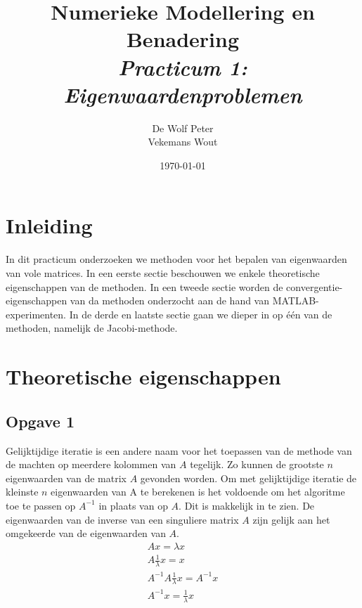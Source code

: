 \documentclass[a4paper, 12pt, titlepage]{report}
\begin{document}
\title{\textbf{Numerieke Modellering en Benadering}\\\textit{Practicum 1: Eigenwaardenproblemen}\\}
\author{De Wolf Peter\\ Vekemans Wout}

\date{\today}
\begin{titlepage}
	\maketitle
	\thispagestyle{empty}
\end{titlepage}

\newpage
\tableofcontents

\listoffigures

\newpage

\section{Inleiding}
In dit practicum onderzoeken we methoden voor het bepalen van eigenwaarden van vole matrices. In een eerste sectie beschouwen we enkele theoretische eigenschappen van de methoden. In een tweede sectie worden de convergentie-eigenschappen van da methoden onderzocht aan de hand van MATLAB-experimenten. In de derde en laatste sectie gaan we dieper in op \'e\'en van de methoden, namelijk de Jacobi-methode.
\section{Theoretische eigenschappen}


\subsection{Opgave 1}
Gelijktijdige iteratie is een andere naam voor het toepassen van de methode van de machten op meerdere kolommen van $A$ tegelijk. Zo kunnen de grootste $n$ eigenwaarden van de matrix $A$ gevonden worden.  Om met gelijktijdige iteratie de kleinste $n$ eigenwaarden van A te berekenen is het voldoende om het algoritme toe te passen op $A^{-1}$ in plaats van op $A$. Dit is makkelijk in te zien. De eigenwaarden van de inverse van een singuliere matrix $A$ zijn gelijk aan het omgekeerde van de eigenwaarden van $A$.\\
\begin{subequations} \label{eq:simIt}
\begin{align}
 Ax  = \lambda x \\
A\frac{1}{\lambda}x =  x\\
A^{-1}A\frac{1}{\lambda}x  =  A^{-1}x\\
A^{-1}x  =  \frac{1}{\lambda}x
\end{align}
\end{subequations}
\end{document}
